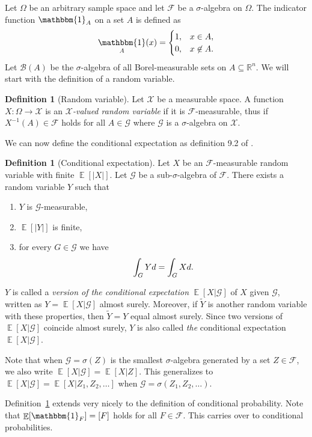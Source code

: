 \documentclass[a4paper]{report}
\theoremstyle{plain}
\theoremstyle{definition}
\newtheorem{definition}[theorem]{Definition}
\theoremstyle{remark}
\numberwithin{equation}{chapter}
\newcommand{\R}{\mathbb{R}}
\let\P\relax
\DeclareMathOperator{\P}{\mathbb{P}}
\DeclareMathOperator{\E}{\mathbb{E}}
\DeclareMathOperator{\1}{\mathbbm{1}}
\newcommand{\F}{\mathcal{F}}
\renewcommand{\G}{\mathcal{G}}
\newcommand{\B}{\mathcal{B}}
\newcommand{\X}{\mathcal{X}}
\begin{document}
Let $\Omega$ be an arbitrary sample space and let $\mathcal{F}$ be a $\sigma$-algebra on $\Omega$. The indicator function $\1_A$ on a set $A$ is defined as
\begin{equation}
\1_A(x)=\begin{cases}1,&x\in A,\\0,&x\not\in A.\end{cases}
\end{equation}
Let $\B(A)$ be the $\sigma$-algebra of all Borel-measurable sets on $A\subseteq\R^n$. We will start with the definition of a random variable.

\begin{definition}[Random variable]
Let $\X$ be a measurable space. A function $X\colon\Omega\to\X$ is an \emph{$\X$-valued random variable} if it is $\F$-measurable, thus if $X^{-1}(A)\in\F$ holds for all $A\in\G$ where $\G$ is a $\sigma$-algebra on $\X$.
\end{definition}

We can now define the conditional expectation as definition 9.2 of \cite{Williams91}.

\begin{definition}[Conditional expectation]\label{def:conexp}
Let $X$ be an $\F$-measurable random variable with finite $\E[|X|]$. Let $\G$ be a sub-$\sigma$-algebra of $\F$. There exists a random variable $Y$ such that
\begin{enumerate}
\item $Y$ is $\G$-measurable,
\item $\E[|Y|]$ is finite,
\item for every $G\in\G$ we have
\begin{equation}
\int_G Yd\P=\int_G Xd\P.
\end{equation}
\end{enumerate}
$Y$ is called a \emph{version of the conditional expectation} $\E[X|\G]$ of $X$ given $\G$, written as $Y=\E[X|\G]$ almost surely. Moreover, if $\tilde{Y}$ is another random variable with these properties, then $\tilde{Y}=Y$ equal almost surely. Since two versions of $\E[X|\G]$ coincide almost surely, $Y$ is also called \emph{the} conditional expectation $\E[X|\G]$.
\end{definition}

Note that when $\G=\sigma(Z)$ is the smallest $\sigma$-algebra generated by a set $Z\in\F$, we also write $\E[X|\G]=\E[X|Z]$. This generalizes to $\E[X|\G]=\E[X|Z_1,Z_2,\ldots]$ when $\G=\sigma(Z_1,Z_2,\ldots)$.

Definition~\ref{def:conexp} extends very nicely to the definition of conditional probability. Note that $\E[\1_F]=\P[F]$ holds for all $F\in\F$. This carries over to conditional probabilities.
\end{document}
